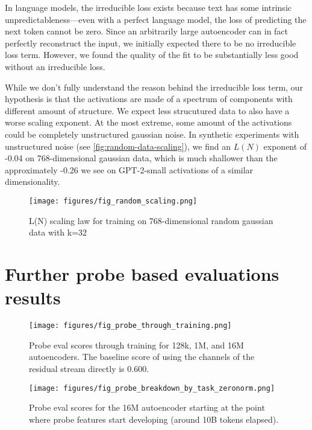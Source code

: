 In language models, the irreducible loss exists because text has some intrinsic unpredictableness---even with a perfect language model, the loss of predicting the next token cannot be zero.
Since an arbitrarily large autoencoder can in fact perfectly reconstruct the input, we initially expected there to be no irreducible loss term. However, we found the quality of the fit to be substantially less good without an irreducible loss.

While we don't fully understand the reason behind the irreducible loss term, our hypothesis is that the activations are made of a spectrum of components with different amount of structure. We expect less strucutured data to also have a worse scaling exponent. At the most extreme, some amount of the activations could be completely unstructured gaussian noise. In synthetic experiments with unstructured noise (see \autoref{fig:random-data-scaling}), we find an $L(N)$ exponent of -0.04 on 768-dimensional gaussian data, which is much shallower than the approximately -0.26 we see on GPT-2-small activations of a similar dimensionality.



\begin{figure}[h]
    \centering
    \texttt{[image: figures/fig\_random\_scaling.png]}
    \caption{L(N) scaling law for training on 768-dimensional random gaussian data with k=32}
    \label{fig:random-data-scaling}
\end{figure}






\section{Further probe based evaluations results}

\begin{figure}[h]
    \centering
    \texttt{[image: figures/fig\_probe\_through\_training.png]}
    \caption{Probe eval scores through training for 128k, 1M, and 16M autoencoders. The baseline score of using the channels of the residual stream directly is 0.600.}
    \label{fig:probes-over-training}
\end{figure}
\begin{figure}[h]
    \centering
    \texttt{[image: figures/fig\_probe\_breakdown\_by\_task\_zeronorm.png]}
    \caption{Probe eval scores for the 16M autoencoder starting at the point where probe features start developing (around 10B tokens elapsed).}
    \label{fig:probes-training-breakdown}
\end{figure}


